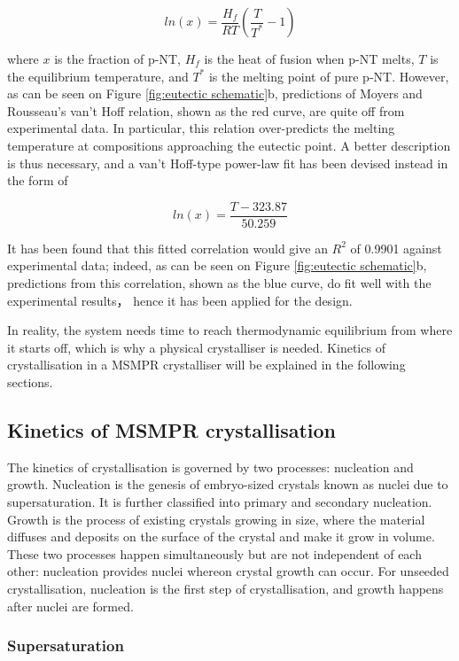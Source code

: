 \begin{equation}
    ln(x) = \frac{H_f}{R T}(\frac{T}{T^*} - 1)
\end{equation}

\noindent where $x$ is the fraction of p-NT, $H_f$ is the heat of fusion when p-NT melts, $T$ is the equilibrium temperature, and $T^*$ is the melting point of pure p-NT. However, as can be seen on Figure \ref{fig:eutectic schematic}b, predictions of Moyers and Rousseau's van't Hoff relation, shown as the red curve, are quite off from experimental data. In particular, this relation over-predicts the melting temperature at compositions approaching the eutectic point. A better description is thus necessary, and a van't Hoff-type power-law fit has been devised instead in the form of 

\begin{equation}
     ln(x) = \frac{T - 323.87}{50.259}
\end{equation}

\noindent It has been found that this fitted correlation would give an $R^2$ of 0.9901 against experimental data; indeed, as can be seen on Figure \ref{fig:eutectic schematic}b, predictions from this correlation, shown as the blue curve, do fit well with the experimental results， hence it has been applied for the design.

In reality, the system needs time to reach thermodynamic equilibrium from where it starts off, which is why a physical crystalliser is needed. Kinetics of crystallisation in a MSMPR crystalliser will be explained in the following sections.

\subsection{Kinetics of MSMPR crystallisation}
The kinetics of crystallisation is governed by two processes: nucleation and growth. Nucleation is the genesis of embryo-sized crystals known as nuclei due to supersaturation. \cite{richardson} It is further classified into primary and secondary nucleation. Growth is the process of existing crystals growing in size, where the material diffuses and deposits on the surface of the crystal and make it grow in volume. These two processes happen simultaneously but are not independent of each other: nucleation provides nuclei whereon crystal growth can occur. For unseeded crystallisation, nucleation is the first step of crystallisation, and growth happens after nuclei are formed. 

\subsubsection{Supersaturation}

